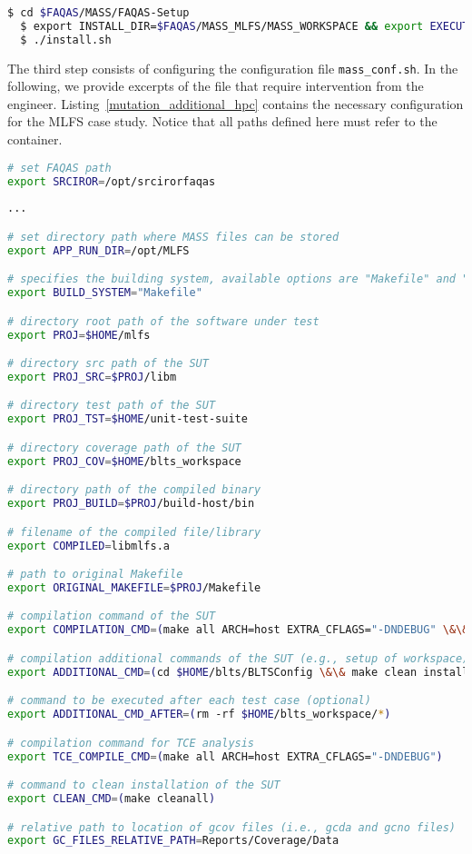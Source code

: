 \begin{lstlisting}[language=bash]
  $ cd $FAQAS/MASS/FAQAS-Setup
  $ export INSTALL_DIR=$FAQAS/MASS_MLFS/MASS_WORKSPACE && export EXECUTION_DIR=/opt/MLFS 
  $ ./install.sh
\end{lstlisting}

The third step consists of configuring the \MASS configuration file \texttt{mass\_conf.sh}. In the following, we provide excerpts of the file that require intervention from the engineer. Listing~\ref{mutation_additional_hpc} contains the necessary configuration for the MLFS case study.
Notice that all paths defined here must refer to the container.

\begin{lstlisting}[language=bash, label=mutation_additional_hpc ,caption=\MASS variables. Excerpt of mass\_conf.sh file.]
# set FAQAS path
export SRCIROR=/opt/srcirorfaqas
                                                     
...

# set directory path where MASS files can be stored
export APP_RUN_DIR=/opt/MLFS

# specifies the building system, available options are "Makefile" and "waf"
export BUILD_SYSTEM="Makefile"

# directory root path of the software under test
export PROJ=$HOME/mlfs

# directory src path of the SUT
export PROJ_SRC=$PROJ/libm

# directory test path of the SUT
export PROJ_TST=$HOME/unit-test-suite

# directory coverage path of the SUT
export PROJ_COV=$HOME/blts_workspace

# directory path of the compiled binary
export PROJ_BUILD=$PROJ/build-host/bin

# filename of the compiled file/library
export COMPILED=libmlfs.a

# path to original Makefile
export ORIGINAL_MAKEFILE=$PROJ/Makefile

# compilation command of the SUT
export COMPILATION_CMD=(make all ARCH=host EXTRA_CFLAGS="-DNDEBUG" \&\& make all COVERAGE="true" ARCH=host_cov EXTRA_CFLAGS="-DNDEBUG")

# compilation additional commands of the SUT (e.g., setup of workspace)
export ADDITIONAL_CMD=(cd $HOME/blts/BLTSConfig \&\& make clean install INSTALL_PATH="$HOME/blts_install" \&\& cd $HOME/blts_workspace \&\& $HOME/blts_install/bin/blts_app --init)

# command to be executed after each test case (optional)
export ADDITIONAL_CMD_AFTER=(rm -rf $HOME/blts_workspace/*)

# compilation command for TCE analysis
export TCE_COMPILE_CMD=(make all ARCH=host EXTRA_CFLAGS="-DNDEBUG")

# command to clean installation of the SUT
export CLEAN_CMD=(make cleanall)

# relative path to location of gcov files (i.e., gcda and gcno files)
export GC_FILES_RELATIVE_PATH=Reports/Coverage/Data
\end{lstlisting}

